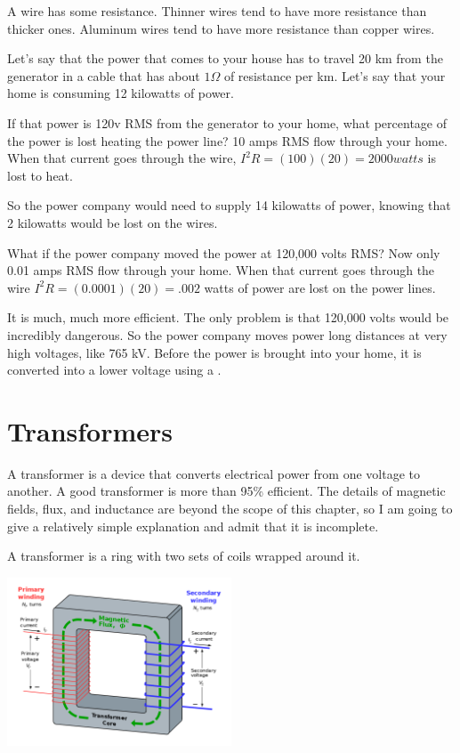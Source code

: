 A wire has some resistance. Thinner wires tend to have more resistance
than thicker ones. Aluminum wires tend to have more resistance than
copper wires.

Let's say that the power that comes to your house has to travel 20 km
from the generator in a cable that has about $1 \Omega$ of resistance
per km.  Let's say that your home is consuming 12 kilowatts of power.

If that power is 120v RMS from the generator to your home, what
percentage of the power is lost heating the power line? 10 amps RMS
flow through your home. When that current goes through the wire, $I^2
R = (100)(20) = 2000 watts$ is lost to heat.

So the power company would need to supply 14 kilowatts of power,
knowing that 2 kilowatts would be lost on the wires.

What if the power company moved the power at 120,000 volts RMS? Now
only 0.01 amps RMS flow through your home. When that current goes
through the wire $I^2R = (0.0001)(20) = .002$ watts of power are lost
on the power lines.

It is much, much more efficient. The only problem is that 120,000 volts
would be incredibly dangerous.  So the power company moves power long
distances at very high voltages, like 765 kV.  Before the power is
brought into your home, it is converted into a lower voltage using a
.

\section{Transformers}

A transformer is a device that converts electrical power from one
voltage to another. A good transformer is more than 95\% efficient. The
details of magnetic fields, flux, and inductance are beyond the scope
of this chapter, so I am going to give a relatively simple explanation
and admit that it is incomplete.

A transformer is a ring with two sets of coils wrapped around it.

\includegraphics[width=0.5\textwidth]{transformer.png}

